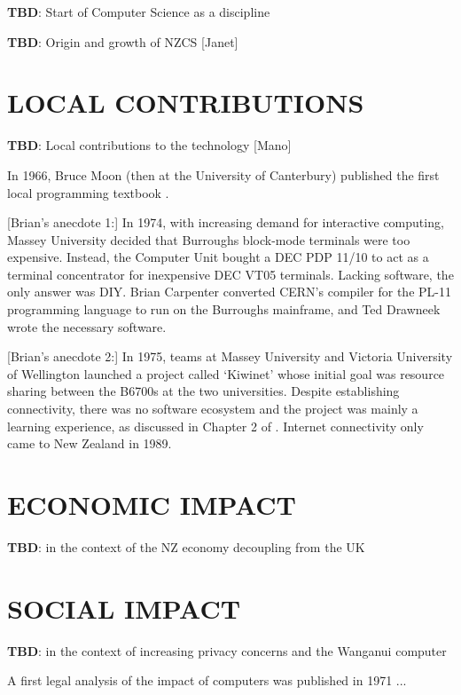 \documentclass{IEEEcsmag}
\begin{document}
{\bf TBD}: Start of Computer Science as a discipline

{\bf TBD}: Origin and growth of NZCS [Janet]

\vspace*{-8pt}
\section{LOCAL CONTRIBUTIONS}

 {\bf TBD}: Local contributions to the technology [Mano]

In 1966, Bruce Moon (then at the University of Canterbury) published the first local programming textbook \cite{MoonProgramming}.

[Brian's anecdote 1:] In 1974, with increasing demand for interactive computing, Massey University decided that Burroughs block-mode terminals were too expensive. Instead, the Computer Unit bought a DEC PDP 11/10 to act as a terminal concentrator for inexpensive DEC VT05 terminals. Lacking software, the only answer was DIY. Brian Carpenter converted CERN's compiler for the PL-11 programming language to run on the Burroughs mainframe, and Ted Drawneek wrote the necessary software.

[Brian's anecdote 2:] In 1975, teams at Massey University and Victoria University of Wellington launched a project called `Kiwinet' whose initial goal was resource sharing between the B6700s at the two universities. Despite establishing connectivity, there was no software ecosystem and the project was mainly a learning experience, as discussed in Chapter 2 of \cite{ConnectingClouds}. Internet connectivity only came to New Zealand in 1989.

\vspace*{-8pt}
\section{ECONOMIC IMPACT}

{\bf TBD}: in the context of the NZ economy decoupling from the UK

\vspace*{-8pt}
\section{SOCIAL IMPACT}

{\bf TBD}: in the context of increasing privacy concerns and the Wanganui computer

A first legal analysis of the impact of computers was published in 1971 \cite{Auburn1971}...
\end{document}
